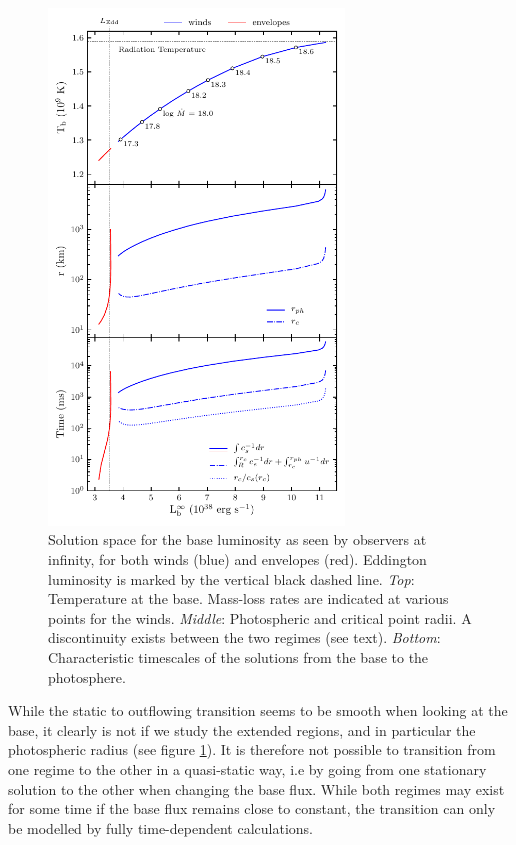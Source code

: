 \documentclass[../main.tex]{subfiles}
\begin{document}
\begin{figure}
    \centering
    \includegraphics[width=0.7\textwidth]{figures/triple.pdf}
    \caption{Solution space for the base luminosity as seen by observers at infinity, for both winds (blue) and envelopes (red).  Eddington luminosity is marked by the vertical black dashed line. \textit{Top}: Temperature at the base.  Mass-loss rates are indicated at various points for the winds.  \textit{Middle}: Photospheric and critical point radii.  A discontinuity exists between the two regimes (see text).  \textit{Bottom}: Characteristic timescales of the solutions from the base to the photosphere.}
    \label{fig:triple}
\end{figure}

While the static to outflowing transition seems to be smooth when looking at the base, it clearly is not if we study the extended regions, and in particular the photospheric radius (see figure \ref{fig:triple}).  It is therefore not possible to transition from one regime to the other in a quasi-static way, i.e by going from one stationary solution to the other when changing the base flux.  While both regimes may exist for some time if the base flux remains close to constant, the transition can only be modelled by fully time-dependent calculations. 
\end{document}
